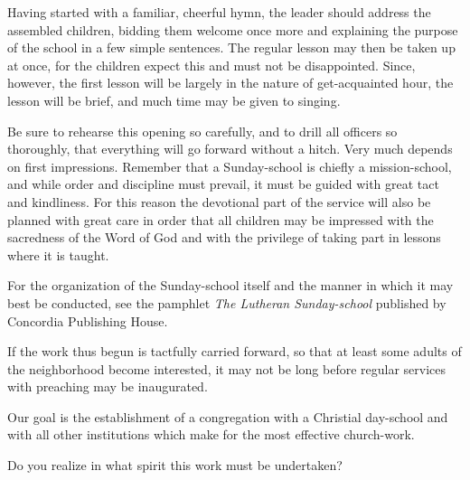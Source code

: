\documentclass[
]{book}
\begin{document}
Having started with a familiar, cheerful hymn, the leader should address the assembled children, bidding them welcome once more and explaining the purpose of the school in a few simple sentences. The regular lesson may then be taken up at once, for the children expect this and must not be disappointed. Since, however, the first lesson will be largely in the nature of get-acquainted hour, the lesson will be brief, and much time may be given to singing.

Be sure to rehearse this opening so carefully, and to drill all officers so thoroughly, that everything will go forward without a hitch. Very much depends on first impressions. Remember that a Sunday-school is chiefly a mission-school, and while order and discipline must prevail, it must be guided with great tact and kindliness. For this reason the devotional part of the service will also be planned with great care in order that all children may be impressed with the sacredness of the Word of God and with the privilege of taking part in lessons where it is taught.

For the organization of the Sunday-school itself and the manner in which it may best be conducted, see the pamphlet \emph{The Lutheran Sunday-school} published by Concordia Publishing House.

If the work thus begun is tactfully carried forward, so that at least some adults of the neighborhood become interested, it may not be long before regular services with preaching may be inaugurated.

Our goal is the establishment of a congregation with a Christial day-school and with all other institutions which make for the most effective church-work.

Do you realize in what spirit this work must be undertaken?
\end{document}
